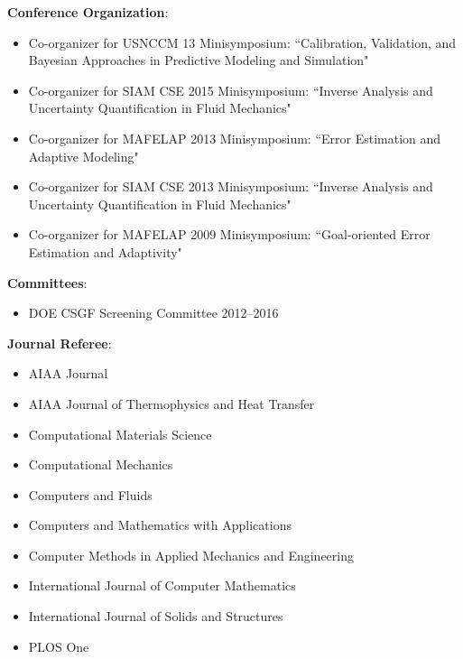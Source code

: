 \textbf{Conference Organization}:
\begin{itemize}
\itemsep 0pt
\item Co-organizer for USNCCM 13 Minisymposium: ``Calibration, Validation, and Bayesian Approaches in Predictive
Modeling and Simulation"
\item Co-organizer for SIAM CSE 2015 Minisymposium: ``Inverse Analysis and Uncertainty Quantification in Fluid Mechanics"
\item Co-organizer for MAFELAP 2013 Minisymposium: ``Error Estimation and Adaptive Modeling"
\item Co-organizer for SIAM CSE 2013 Minisymposium: ``Inverse Analysis and Uncertainty Quantification in Fluid Mechanics"
\item Co-organizer for MAFELAP 2009 Minisymposium: ``Goal-oriented Error Estimation and Adaptivity"
\end{itemize}

\blankline

\textbf{Committees}:
\begin{itemize}
\itemsep 0pt
\item DOE CSGF Screening Committee 2012--2016
\end{itemize}

\blankline


\textbf{Journal Referee}:
\begin{itemize}
\itemsep 0pt
\item AIAA Journal
\item AIAA Journal of Thermophysics and Heat Transfer
\item Computational Materials Science
\item Computational Mechanics
\item Computers and Fluids
\item Computers and Mathematics with Applications
\item Computer Methods in Applied Mechanics and Engineering
\item International Journal of Computer Mathematics
\item International Journal of Solids and Structures
\item PLOS One
\end{itemize}
